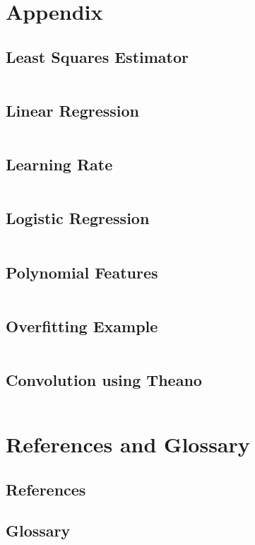 \documentclass[a4paper,twoside,10pt]{article}
\begin{document}
\clearpage

\appendix
\section{Appendix}
\subsection{Least Squares Estimator}\label{app:lse}
\inputminted[frame=lines,linenos,fontsize=\small]{python}{least_squares.py}

\subsection{Linear Regression}\label{app:gradientdescent}
\inputminted[frame=lines,linenos,fontsize=\small]{python}{gradient_descent.py}

\subsection{Learning Rate}\label{app:alphas}
\inputminted[frame=lines,linenos,fontsize=\small]{python}{learning_rate.py}

\subsection{Logistic Regression}\label{app:classifier}
\inputminted[frame=lines,linenos,fontsize=\small]{python}{classifier.py}

\subsection{Polynomial Features}\label{app:polynomial}
\inputminted[frame=lines,linenos,fontsize=\small]{python}{polynomial.py}

\subsection{Overfitting Example}\label{app:overfitting}
\inputminted[frame=lines,linenos,fontsize=\small]{python}{overfitting.py}

\subsection{Convolution using Theano}
\inputminted[frame=lines,linenos,fontsize=\small]{python}{convolution.py}

\section{References and Glossary}
\subsection{References}
\printbibliography[heading=none]

\subsection{Glossary}
\begin{acronym}[L-BFGS]
\end{acronym}
\end{document}
